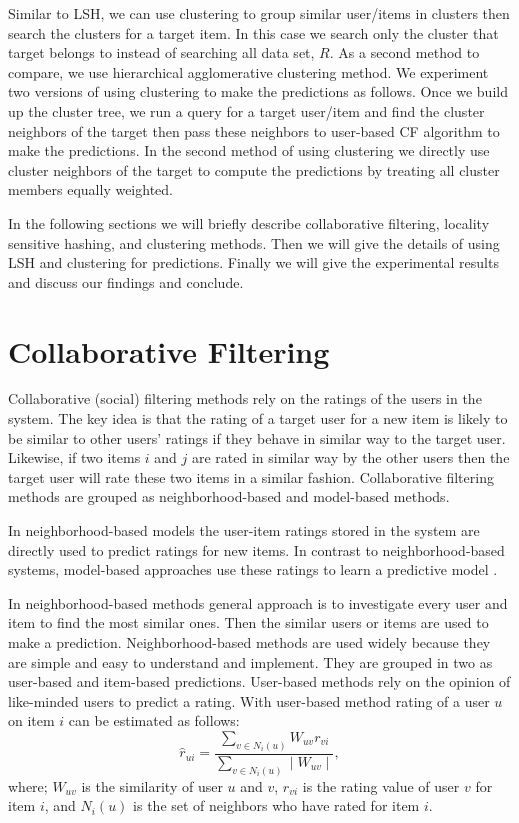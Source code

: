 \documentclass[conference]{IEEEtran}
\begin{document}
Similar to LSH, we can use clustering to group similar user/items in clusters 
then search the clusters for a target item. In this case we search only the 
cluster that target belongs to instead of searching all data set, $R$. As a 
second method to compare, we use hierarchical agglomerative clustering method. 
We experiment two versions of using clustering to make the predictions as 
follows. Once we build up the cluster tree, we run a query for a target 
user/item and find the cluster neighbors of the target then pass these
neighbors to user-based CF algorithm to make the predictions. In the second 
method of using clustering we directly use cluster neighbors of the target to 
compute the predictions by treating all cluster members equally weighted.

In the following sections we will briefly describe collaborative filtering, 
locality sensitive hashing, and clustering methods. Then we will give the 
details of using LSH and clustering for predictions. Finally we will give the
experimental results and discuss our findings and conclude.

\section{Collaborative Filtering}
\label{sec:cf}

Collaborative (social) filtering methods rely on the ratings of the users in the 
system. The key idea is that the rating of a target user for a new item is likely 
to be similar to other users' ratings if they behave in similar way to the target 
user. Likewise, if two items $i$ and $j$ are rated in similar way by the other users 
then the target user will rate these two items in a similar fashion. Collaborative 
filtering methods are grouped as neighborhood-based and model-based methods. 

In  neighborhood-based models the user-item ratings stored in the system are
directly used to predict ratings for new items. In contrast to neighborhood-based 
systems, model-based approaches use these ratings to learn a predictive model 
\cite{DBLP:journals/ir/HerlockerKR02}.

In neighborhood-based methods general approach is to investigate every user and 
item to find the most similar ones. Then the similar users or items are used to 
make a prediction. Neighborhood-based methods are used widely because they are 
simple and easy to understand and implement. They are grouped in two as user-based 
and item-based predictions. User-based methods rely on the opinion of like-minded 
users to predict a rating. With user-based method rating of a user $u$ on item $i$ 
can be estimated as follows:
\[
\hat{r}_{ui} = \frac{\sum\limits_{v \in N_i(u)} W_{uv}r_{vi}}{\sum\limits_{v \in N_i(u)} \mid W_{uv} \mid},
\]
where; $W_{uv}$ is the similarity of user $u$ and $v$, $r_{vi}$ is the rating value 
of user $v$ for item $i$, and $N_i(u)$ is the set of neighbors who have rated for  
item $i$.
\end{document}
